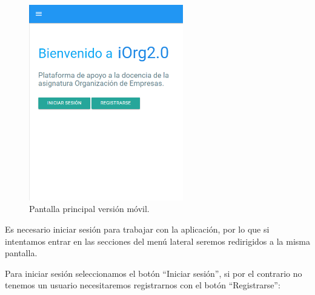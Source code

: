 \begin{figure}[!ht]
  \begin{center}
    \includegraphics[width=0.6\textwidth]{../images/manual/home_m.png}
    \caption{Pantalla principal versión móvil.}
    \label{fig:home_m}
  \end{center}
\end{figure}



\bigskip
Es necesario iniciar sesión para trabajar con la aplicación, por lo que si intentamos entrar en las secciones del menú lateral seremos redirigidos a la misma pantalla.

\bigskip
Para iniciar sesión seleccionamos el botón ``Iniciar sesión'', si por el contrario no tenemos un usuario necesitaremos registrarnos con el botón ``Registrarse'':


